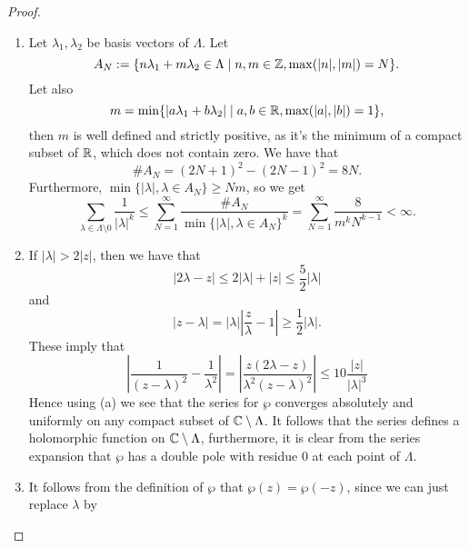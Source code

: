 \begin{proof}
	\begin{enumerate}[label=(\alph*)]
	\item	Let $\lambda_1, \lambda_2$ be basis vectors of $\Lambda$.
		Let 
		\begin{equation*}
			A_N := \{n\lambda_1 + m\lambda_2 \in \Lambda \mid
			n, m \in \mathbb{Z}, \max(|n|, |m|) = N\}.
		\end{equation*}
		Let also 
		\begin{equation*}
			m = \min\{|a\lambda_1 + b\lambda_2| \mid 
			a, b \in \mathbb{R}, \max(|a|,|b|) = 1\},
		\end{equation*}
		then $m$ is well defined and strictly positive,
		as it's the minimum of a compact subset of $\mathbb{R}$, which does
		not contain zero. We have that
		\begin{equation*}
			\#A_N = (2N + 1)^2 - (2N - 1)^2 = 8N.
		\end{equation*}
		Furthermore, $\min\{|\lambda|, \lambda \in A_N\} \geq Nm$, so we
		get
		\begin{equation*}
			\sum_{\lambda \in \Lambda\setminus 0}\frac{1}{|\lambda|^k}
			\leq \sum_{N=1}^\infty \frac{\#A_N}{\min\{|\lambda|, \lambda \in
			A_N\}^k}
			= \sum_{N=1}^{\infty} \frac{8}{m^kN^{k-1}} < \infty.
		\end{equation*}
	\item
		If $|\lambda| > 2|z|$, then we have that
		\begin{equation*}
			|2\lambda - z| \leq 2|\lambda| + |z| \leq \frac{5}{2}|\lambda|
		\end{equation*}
		and
		\begin{equation*}
			|z - \lambda| = |\lambda|\left|\frac{z}{\lambda} - 1\right| \geq
			\frac{1}{2}|\lambda|.
		\end{equation*}
		These imply that
		\begin{equation*}
			\left| \frac{1}{(z - \lambda)^2} - \frac{1}{\lambda^2}\right|
			= \left| \frac{z(2\lambda - z)}{\lambda^2(z - \lambda)^2}\right|
			\leq 10\frac{|z|}{|\lambda|^3}
		\end{equation*}
		Hence using (a) we see that
		the series for $\wp$ converges absolutely and uniformly on any 
		compact subset of $\mathbb{C} \setminus \Lambda$. It follows that
		the series defines a holomorphic function on $\mathbb{C} \setminus \Lambda$,
		furthermore, it is clear from the series expansion that $\wp$ has
		a double pole with residue $0$ at each point of $\Lambda$.
	\item It follows from the definition of $\wp$ that
		$\wp(z) = \wp(-z)$, since we can just replace $\lambda$ by 

\end{enumerate}
\end{proof}
